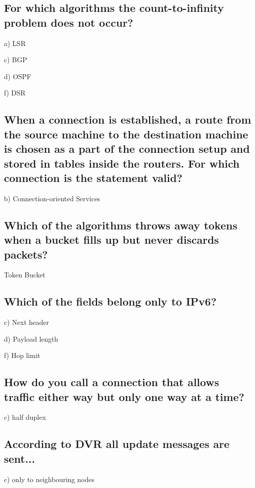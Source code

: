 \documentclass[a4paper,
			llpt,
			solution,
			accentcolor=tud2d,
			colorbacktitle
			]
			{tudexercise}
\newcommand{\8}{$\infty$}
\begin{document}
\subsection{For which algorithms the count-to-infinity problem does not occur?}
\begin{compactenum}
\item[a)] LSR
\item[c)] BGP
\item[d)] OSPF
\item[f)] DSR
\end{compactenum}
\subsection{When a connection is established, a route from the source machine to the destination machine is chosen as a part of the connection setup and stored in tables inside the routers. For which connection is the statement valid?}
\begin{compactenum}
\item[b)]{Connection-oriented Services}
\end{compactenum}
\subsection{Which of the algorithms throws away tokens when a bucket fills up but never discards packets?}
\begin{compactenum}
\item Token Bucket
\end{compactenum}
\subsection{Which of the fields belong only to IPv6?}
\begin{compactenum}
\item[c)] Next header
\item[d)] Payload length
\item[f)] Hop limit
\end{compactenum}
\subsection{How do you call a connection that allows traffic either way but only one way at a time?}
\begin{compactenum}
\item[c)]{half duplex}
\end{compactenum}
\subsection{According to DVR all update messages are sent...}
\begin{compactenum}
\item[c)]{only to neighbouring nodes}
\end{compactenum}
\end{document}
